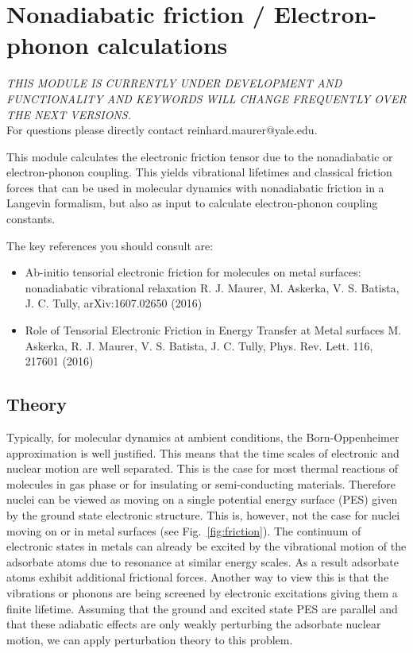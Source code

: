 \section{Nonadiabatic friction / Electron-phonon calculations}\label{Sec:Friction}

\emph{THIS MODULE IS CURRENTLY UNDER DEVELOPMENT AND FUNCTIONALITY AND KEYWORDS WILL CHANGE FREQUENTLY OVER THE NEXT VERSIONS.}\\
For questions please directly contact reinhard.maurer@yale.edu.

This module calculates the electronic friction tensor due to the nonadiabatic or electron-phonon coupling. This yields vibrational lifetimes and classical friction forces that can be used in molecular dynamics with nonadiabatic friction in a Langevin formalism, but also as input to calculate electron-phonon coupling constants.

The key references you should consult are:

\begin{itemize}
 \item Ab-initio tensorial electronic friction for molecules on metal surfaces: nonadiabatic vibrational relaxation
 R. J. Maurer, M. Askerka, V. S. Batista, J. C. Tully, arXiv:1607.02650 (2016)
 \item Role of Tensorial Electronic Friction in Energy Transfer at Metal surfaces
 M. Askerka, R. J. Maurer, V. S. Batista, J. C. Tully, Phys. Rev. Lett. 116, 217601 (2016)
\end{itemize}

\subsection*{Theory}

Typically, for molecular dynamics at ambient conditions, the Born-Oppenheimer approximation is well justified. This means that the time scales of electronic and nuclear motion are well separated. This is the case for most thermal reactions of molecules in gas phase or for insulating or semi-conducting materials. Therefore nuclei can be viewed as moving on a single potential energy surface (PES) given by the ground state electronic structure. This is, however, not the case for nuclei moving on or in metal surfaces (see Fig.~\ref{fig:friction}). The continuum of electronic states in metals can already be excited by the vibrational motion of the adsorbate atoms due to resonance at similar energy scales. As a result adsorbate atoms exhibit additional frictional forces. Another way to view this is that the vibrations or phonons are being screened by electronic excitations giving them a finite lifetime. Assuming that the ground and excited state PES are parallel and that these adiabatic effects are only weakly perturbing the adsorbate nuclear motion, we can apply perturbation theory to this problem. 

